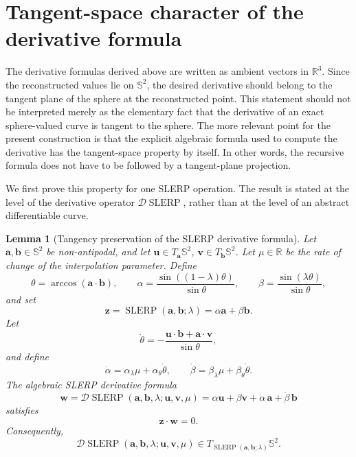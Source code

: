 \documentclass[a4paper,11pt]{article}
\newcommand{\bz}{\mathbf{z}}
\newcommand{\ba}{\mathbf{a}}
\newcommand{\bb}{\mathbf{b}}
\newcommand{\bu}{\mathbf{u}}
\newcommand{\bv}{\mathbf{v}}
\newcommand{\bw}{\mathbf{w}}
\numberwithin{equation}{section}
\theoremstyle{plain}
\newtheorem{lemma}[thm]{Lemma}
\theoremstyle{definition}
\theoremstyle{remark}
\newcommand{\slerp}{\operatorname{SLERP}}
\begin{document}
\section{Tangent-space character of the derivative formula}\label{sec:tangent-space}

The derivative formulas derived above are written as ambient vectors in \(\mathbb{R}^3\).  Since the reconstructed values lie on \(\mathbb{S}^2\), the desired derivative should belong to the tangent plane of the sphere at the reconstructed point.  This statement should not be interpreted merely as the elementary fact that the derivative of an exact sphere-valued curve is tangent to the sphere.  The more relevant point for the present construction is that the explicit algebraic formula used to compute the derivative has the tangent-space property by itself.  In other words, the recursive formula does not have to be followed by a tangent-plane projection.

We first prove this property for one SLERP operation.  The result is stated at the level of the derivative operator \(\mathcal{D}\slerp\), rather than at the level of an abstract differentiable curve.

\begin{lemma}[Tangency preservation of the SLERP derivative formula]\label{lem:slerp-formula-tangent}
Let \(\ba,\bb\in\mathbb{S}^2\) be non-antipodal, and let \(\bu\in T_{\ba}\mathbb{S}^2\), \(\bv\in T_{\bb}\mathbb{S}^2\).  Let \(\mu\in\mathbb{R}\) be the rate of change of the interpolation parameter.  Define
\[
        \theta=\arccos(\ba\cdot\bb),\qquad
        \alpha=\frac{\sin((1-\lambda)\theta)}{\sin\theta},
        \qquad
        \beta=\frac{\sin(\lambda\theta)}{\sin\theta},
\]
and set
\[
        \bz=\slerp(\ba,\bb;\lambda)=\alpha\ba+\beta\bb .
\]
Let
\[
        \dot\theta
        =
        -\frac{\bu\cdot\bb+\ba\cdot\bv}{\sin\theta},
\]
and define
\[
        \dot\alpha=\alpha_\lambda \mu+\alpha_\theta\dot\theta,
        \qquad
        \dot\beta=\beta_\lambda \mu+\beta_\theta\dot\theta .
\]
The algebraic SLERP derivative formula
\[
        \bw
        =
        \mathcal{D}\slerp(\ba,\bb,\lambda;\bu,\bv,\mu)
        =
        \alpha\bu+\beta\bv+\dot\alpha\,\ba+\dot\beta\,\bb
\]
satisfies
\[
        \bz\cdot\bw=0 .
\]
Consequently,
\[
        \mathcal{D}\slerp(\ba,\bb,\lambda;\bu,\bv,\mu)
        \in T_{\slerp(\ba,\bb;\lambda)}\mathbb{S}^2 .
\]
\end{lemma}
\end{document}
